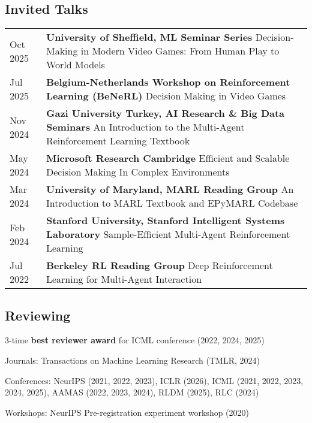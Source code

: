 \documentclass[a4paper,12pt]{article}
\begin{document}
\subsection{Invited Talks}
\begin{tabularx}{\linewidth}{@{}l X@{}}
    Oct 2025 & \textbf{University of Sheffield, ML Seminar Series} \newline Decision-Making in Modern Video Games: From Human Play to World Models \\
    Jul 2025 & \textbf{Belgium-Netherlands Workshop on Reinforcement Learning (BeNeRL)} \newline Decision Making in Video Games \\
    Nov 2024 & \textbf{Gazi University Turkey, AI Research \& Big Data Seminars} \newline An Introduction to the Multi-Agent Reinforcement Learning Textbook \\
    May 2024 & \textbf{Microsoft Research Cambridge} \newline Efficient and Scalable Decision Making In Complex Environments \\
    Mar 2024 & \textbf{University of Maryland, MARL Reading Group} \newline An Introduction to MARL Textbook and EPyMARL Codebase \\
    Feb 2024 & \textbf{Stanford University, Stanford Intelligent Systems Laboratory} \newline Sample-Efficient Multi-Agent Reinforcement Learning \\
    Jul 2022 & \textbf{Berkeley RL Reading Group} \newline Deep Reinforcement Learning for Multi-Agent Interaction \\
\end{tabularx}
\expspace

\subsection{Reviewing}
\begin{expblock}
    \begin{explist}
	\item 3-time \textbf{best reviewer award} for ICML conference (2022, 2024, 2025)
	\item Journals: Transactions on Machine Learning Research (TMLR, 2024)
	\item Conferences: NeurIPS (2021, 2022, 2023), ICLR (2026), ICML (2021, 2022, 2023, 2024, 2025), AAMAS (2022, 2023, 2024), RLDM (2025), RLC (2024)
	\item Workshops: NeurIPS Pre-registration experiment workshop (2020)
    \end{explist}
\end{expblock}
\end{document}
